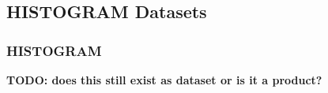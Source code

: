\documentclass[a4paper,11pt,pdftex,twoside]{scrartcl}
\renewcommand{\bf}{\normalfont \bfseries}
\begin{document}
{{{\subsection{HISTOGRAM Datasets}

\subsubsection{HISTOGRAM}
\label{subsec_histogram}

{\bf TODO: does this still exist as dataset or is it a product?}

%


}}}
\end{document}
